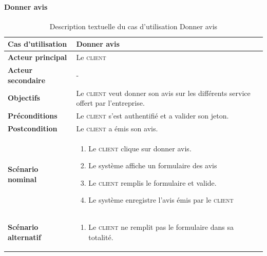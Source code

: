         \paragraph[Donner avis]{Donner avis}
        \begin{longtable}{p{4cm} p{9cm}}
            \caption{Description textuelle du cas d’utilisation Donner avis}
            \label{table:usecaseDonnerAvis}
            \\\hline\hline
                \textbf{Cas d’utilisation} & \textbf{Donner avis}
            \\\hline\hline
                    \textbf{Acteur principal} & Le \textsc{client}
                \\
                    \textbf{Acteur secondaire} & -
                \\
                    \textbf{Objectifs} & Le \textsc{client} veut donner son avis sur
                    les différents service offert par l’entreprise.
                \\
                    \textbf{Préconditions} & Le \textsc{client} s’est authentifié et
                    a valider son jeton.
                \\
                    \textbf{Postcondition} & Le \textsc{client} a émis son avis.
                \\
                \textbf{Scénario nominal} &
                    \begin{enumerate}[leftmargin=*]
                        \item Le \textsc{client} clique sur donner avis.
                        \item Le système affiche un formulaire des avis
                        \item Le \textsc{client} remplis le formulaire et valide.
                        \item Le système enregistre l’avis émis par le \textsc{client}
                    \end{enumerate}
                \\
                \textbf{Scénario alternatif} &
                    \begin{enumerate}[leftmargin=*]
                        \item Le \textsc{client} ne remplit pas le formulaire
                        dans sa totalité.
                    \end{enumerate}
            \\\bottomrule
        \end{longtable}


